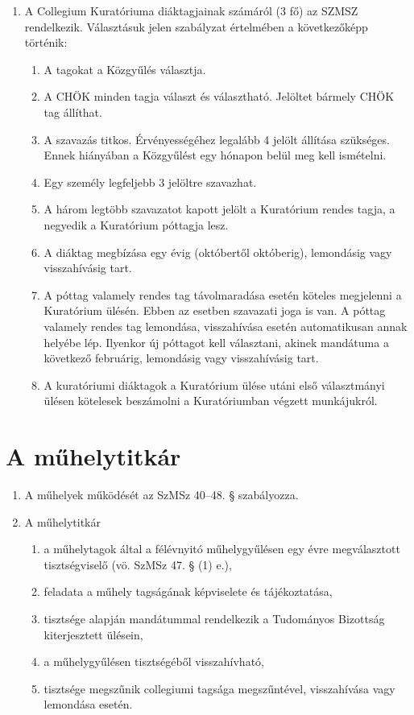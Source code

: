 \documentclass{../styles/rulebook}
\begin{document}
\begin{enumerate}
	\item A Collegium Kuratóriuma diáktagjainak számáról (3 fő) az SZMSZ rendelkezik. Választásuk jelen szabályzat értelmében a következőképp történik: 
	\begin{enumerate}
		\item A tagokat a Közgyűlés választja.
		\item A CHÖK minden tagja választ és választható. Jelöltet bármely CHÖK tag állíthat.
		\item A szavazás titkos. Érvényességéhez legalább 4 jelölt állítása szükséges. Ennek hiányában a Közgyűlést egy hónapon belül meg kell ismételni.
		\item Egy személy legfeljebb 3 jelöltre szavazhat.
		\item A három legtöbb szavazatot kapott jelölt a Kuratórium rendes tagja, a negyedik a Kuratórium póttagja lesz.
		\item A diáktag megbízása egy évig (októbertől októberig), lemondásig vagy visszahívásig tart.
		\item A póttag valamely rendes tag távolmaradása esetén köteles megjelenni a Kuratórium ülésén. Ebben az esetben szavazati joga is van. A póttag valamely rendes tag lemondása, visszahívása esetén automatikusan annak helyébe lép. Ilyenkor új póttagot kell választani, akinek mandátuma a következő februárig, lemondásig vagy visszahívásig tart.
		\item A kuratóriumi diáktagok a Kuratórium ülése utáni első választmányi ülésen kötelesek beszámolni a Kuratóriumban végzett munkájukról.
	\end{enumerate}
\end{enumerate}


\section{A műhelytitkár}

\begin{enumerate}
	\item A műhelyek működését az SzMSz 40–48. § szabályozza.
	\item A műhelytitkár
	\begin{enumerate}
		\item a műhelytagok által a félévnyitó műhelygyűlésen egy évre megválasztott tisztségviselő (vö. SzMSz 47. § (1) e.),
		\item feladata a műhely tagságának képviselete és tájékoztatása,
		\item tisztsége alapján mandátummal rendelkezik a Tudományos Bizottság kiterjesztett ülésein,
		\item a műhelygyűlésen tisztségéből visszahívható,
		\item tisztsége megszűnik collegiumi tagsága megszűntével, visszahívása vagy lemondása esetén.
	\end{enumerate}
\end{enumerate}
\end{document}
